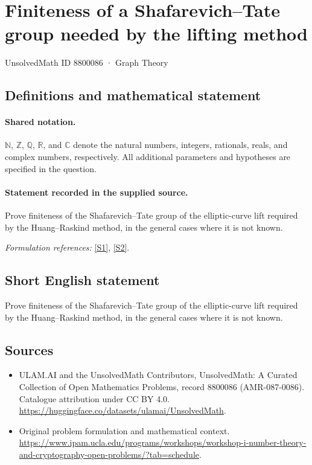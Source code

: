 \documentclass[11pt]{article}
\newcommand{\sref}[2]{\hyperlink{source:#1:#2}{[S#2]}}
\begin{document}
\setcounter{section}{8800085}
\section{Finiteness of a Shafarevich–Tate group needed by the lifting method}\label{8800086}
{\small UnsolvedMath ID 8800086 · Graph Theory}
\subsection{Definitions and mathematical statement}

\paragraph{Shared notation.}$\mathbb N$, $\mathbb Z$, $\mathbb Q$, $\mathbb R$, and $\mathbb C$ denote the natural numbers, integers, rationals, reals, and complex numbers, respectively. All additional parameters and hypotheses are specified in the question.


\paragraph{Statement recorded in the supplied source.}
Prove finiteness of the Shafarevich–Tate group of the elliptic-curve lift required by the Huang–Raskind method, in the general cases where it is not known.
\par\smallskip\textit{Formulation references:} \sref{8800086}{1}, \sref{8800086}{2}.
\subsection{Short English statement}
Prove finiteness of the Shafarevich–Tate group of the elliptic-curve lift required by the Huang–Raskind method, in the general cases where it is not known.
\subsection{Sources}
\begin{itemize}
\item[\hypertarget{source:8800086:1}{S1}] ULAM.AI and the UnsolvedMath Contributors, UnsolvedMath: A Curated Collection of Open Mathematics Problems, record 8800086 (AMR-087-0086). Catalogue attribution under CC BY 4.0.
\url{https://huggingface.co/datasets/ulamai/UnsolvedMath}.
\item[\hypertarget{source:8800086:2}{S2}] Original problem formulation and mathematical context.
\url{https://www.ipam.ucla.edu/programs/workshops/workshop-i-number-theory-and-cryptography-open-problems/?tab=schedule}.
\end{itemize}
\label{end:8800086}
\end{document}
